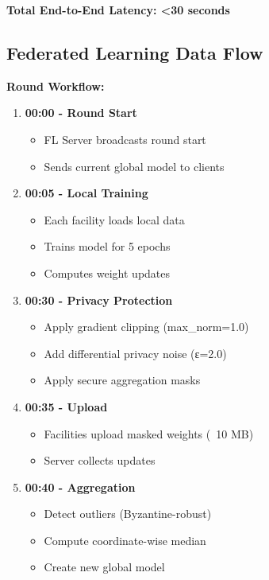 \documentclass[12pt,a4paper]{article}
\begin{document}
\textbf{Total End-to-End Latency: <30 seconds}

\subsection{Federated Learning Data Flow}

\textbf{Round Workflow:}

\begin{enumerate}[leftmargin=1cm,itemsep=0pt]
    \item \textbf{00:00 - Round Start}
    \begin{itemize}[leftmargin=0.5cm,itemsep=0pt]
        \item FL Server broadcasts round start
        \item Sends current global model to clients
    \end{itemize}
    
    \item \textbf{00:05 - Local Training}
    \begin{itemize}[leftmargin=0.5cm,itemsep=0pt]
        \item Each facility loads local data
        \item Trains model for 5 epochs
        \item Computes weight updates
    \end{itemize}
    
    \item \textbf{00:30 - Privacy Protection}
    \begin{itemize}[leftmargin=0.5cm,itemsep=0pt]
        \item Apply gradient clipping (max\_norm=1.0)
        \item Add differential privacy noise (ε=2.0)
        \item Apply secure aggregation masks
    \end{itemize}
    
    \item \textbf{00:35 - Upload}
    \begin{itemize}[leftmargin=0.5cm,itemsep=0pt]
        \item Facilities upload masked weights (~10 MB)
        \item Server collects updates
    \end{itemize}
    
    \item \textbf{00:40 - Aggregation}
    \begin{itemize}[leftmargin=0.5cm,itemsep=0pt]
        \item Detect outliers (Byzantine-robust)
        \item Compute coordinate-wise median
        \item Create new global model
    \end{itemize}
    

\end{enumerate}
\end{document}
